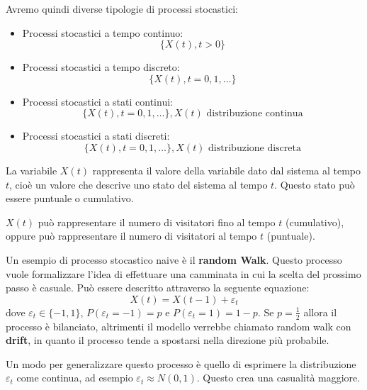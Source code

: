 Avremo quindi diverse tipologie di processi stocastici:
\begin{itemize}
    \item Processi stocastici a tempo continuo:
          \begin{equation*}
              \{X(t), t>0\}
          \end{equation*}
    \item Processi stocastici a tempo discreto:
          \begin{equation*}
              \{X(t), t=0,1,\dots\}
          \end{equation*}
    \item Processi stocastici a stati continui:
          \begin{equation*}
              \{X(t), t=0,1,\dots\}, X(t) \text{ distribuzione continua}
          \end{equation*}
    \item Processi stocastici a stati discreti:
          \begin{equation*}
              \{X(t), t=0,1,\dots\}, X(t) \text{ distribuzione discreta}
          \end{equation*}
\end{itemize}
La variabile $X(t)$ rappresenta il valore della variabile dato dal sistema al
tempo $t$, cioè un valore che descrive uno stato del sistema al tempo $t$. Questo
stato può essere puntuale o cumulativo.
\begin{esempio}
    $X(t)$ può rappresentare il numero di visitatori fino al tempo $t$ (cumulativo),
    oppure può rappresentare il numero di visitatori al tempo $t$ (puntuale).
\end{esempio}
Un esempio di processo stocastico naive è il \textbf{random Walk}. Questo processo
vuole formalizzare l'idea di effettuare una camminata in cui la scelta del prossimo
passo è casuale. Può essere descritto attraverso la seguente equazione:
\begin{equation*}
    X(t) = X(t-1) + \varepsilon_t
\end{equation*}
dove $\varepsilon_t \in \{-1, 1\}$,  $P(\varepsilon_t = -1) = p$ e $P(\varepsilon_t = 1) = 1- p$.
Se $p=\frac{1}{2}$ allora il processo è bilanciato, altrimenti il modello verrebbe
chiamato random walk con \textbf{drift}, in quanto il processo tende a spostarsi
nella direzione più probabile.

Un modo per generalizzare questo processo è quello di esprimere la distribuzione
$\varepsilon_t$ come continua, ad esempio $\varepsilon_t \approx N(0, 1)$. Questo
crea una casualità maggiore.

